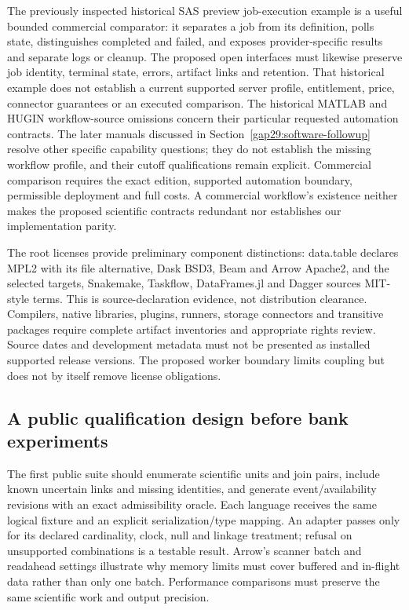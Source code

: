 The previously inspected historical SAS preview job-execution example is a useful bounded commercial comparator: it separates a job from its definition, polls state, distinguishes completed and failed, and exposes provider-specific results and separate logs or cleanup. The proposed open interfaces must likewise preserve job identity, terminal state, errors, artifact links and retention. That historical example does not establish a current supported server profile, entitlement, price, connector guarantees or an executed comparison. The historical MATLAB and HUGIN workflow-source omissions concern their particular requested automation contracts. The later manuals discussed in Section~\ref{gap29:software-followup} resolve other specific capability questions; they do not establish the missing workflow profile, and their cutoff qualifications remain explicit. Commercial comparison requires the exact edition, supported automation boundary, permissible deployment and full costs. A commercial workflow's existence neither makes the proposed scientific contracts redundant nor establishes our implementation parity.~\citep{exec24_workflow_contracts_sas,exec25_dww_choice}

The root licenses provide preliminary component distinctions: data.table declares MPL2 with its file alternative, Dask BSD3, Beam and Arrow Apache2, and the selected targets, Snakemake, Taskflow, DataFrames.jl and Dagger sources MIT-style terms. This is source-declaration evidence, not distribution clearance. Compilers, native libraries, plugins, runners, storage connectors and transitive packages require complete artifact inventories and appropriate rights review. Source dates and development metadata must not be presented as installed supported release versions. The proposed worker boundary limits coupling but does not by itself remove license obligations.~\citep{exec25_dww_datatable,exec25_dww_targets,exec25_dww_dask,exec25_dww_snakemake,exec25_dww_beam,exec25_dww_arrow,exec25_dww_taskflow,exec25_dww_dataframes,exec25_dww_dagger}

\subsection{A public qualification design before bank experiments}

The first public suite should enumerate scientific units and join pairs, include known uncertain links and missing identities, and generate event/availability revisions with an exact admissibility oracle. Each language receives the same logical fixture and an explicit serialization/type mapping. An adapter passes only for its declared cardinality, clock, null and linkage treatment; refusal on unsupported combinations is a testable result. Arrow's scanner batch and readahead settings illustrate why memory limits must cover buffered and in-flight data rather than only one batch. Performance comparisons must preserve the same scientific work and output precision.~\citep{exec25_dww_arrow,exec25_dww_choice}

